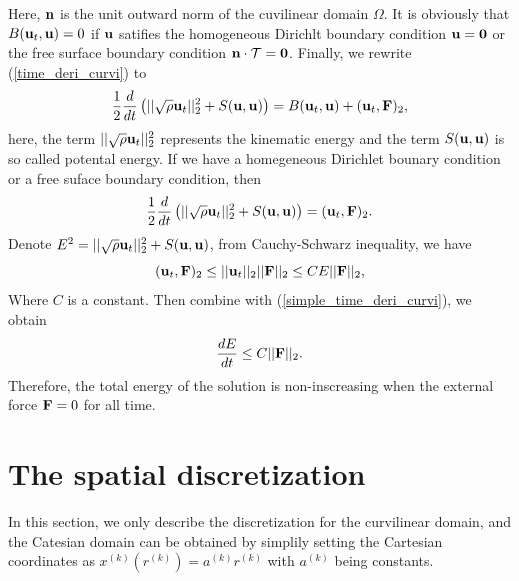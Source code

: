 \documentclass[a4paper]{article}
\begin{document}
Here, ${\bf n}$ is the unit outward norm of the cuvilinear domain $\Omega$. It is obviously that $B({\bf u}_t, {\bf u}) = 0$ if ${\bf u}$ satifies the homogeneous Dirichlt boundary condition ${\bf u} = {\bf 0}$ or the free surface boundary condition ${\bf n}\cdot\mathcal{T} = {\bf 0}$. Finally, we rewrite (\ref{time_deri_curvi}) to
\begin{equation*}
\frac{1}{2}\frac{d}{dt} \left(||\sqrt{\rho}{\bf u}_t||_2^2 + S({\bf u},{\bf u})\right) = B({\bf u}_t,{\bf u}) + ({\bf u}_t,{\bf F})_2,
\end{equation*}
here, the term $||\sqrt{\rho}{\bf u}_t||_2^2$ represents the kinematic energy and the term $S({\bf u},{\bf u})$ is so called potental energy. If we have a homegeneous Dirichlet bounary condition or a free suface boundary condition, then
\begin{equation}\label{simple_time_deri_curvi}
\frac{1}{2}\frac{d}{dt} \left(||\sqrt{\rho}{\bf u}_t||_2^2 + S({\bf u},{\bf u})\right) =  ({\bf u}_t,{\bf F})_2.
\end{equation}
Denote ${E}^2 = ||\sqrt{\rho}{\bf u}_t||_2^2 + S({\bf u},{\bf u})$, from Cauchy-Schwarz inequality, we have
\begin{equation*}
({\bf u}_t,{\bf F})_2\leq ||{\bf u}_t||_2 ||{\bf F}||_2\leq CE||{\bf F}||_2,
\end{equation*}
Where $C$ is a constant. Then combine with (\ref{simple_time_deri_curvi}), we obtain
\begin{equation*}
\frac{dE}{dt} \leq C||{\bf F}||_2.
\end{equation*}
Therefore, the total energy of the solution is non-inscreasing when the external force ${\bf F} = 0$ for all time.

\section{The spatial discretization}

In this section, we only describe the discretization for the curvilinear domain, and the Catesian domain can be obtained by simplily setting the Cartesian coordinates as $x^{(k)}(r^{(k)}) = a^{(k)}r^{(k)} $ with $a^{(k)}$ being constants.
\end{document}
